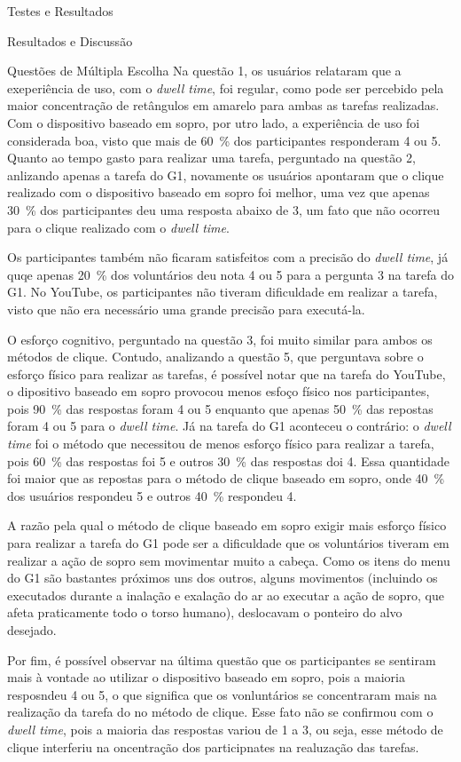 \begin{chapter}{Testes e Resultados}
\begin{section}{Resultados e Discussão}
\begin{subsection}{Questões de Múltipla Escolha}
Na questão 1, os usuários relataram que a exeperiência de uso, com o
\textit{dwell time}, foi regular, como pode ser percebido pela maior
concentração de retângulos em amarelo para ambas as tarefas realizadas. Com o
dispositivo baseado em sopro, por utro lado, a experiência de uso foi
considerada boa, visto que mais de 60~\% dos participantes responderam 4 ou 5.
Quanto ao tempo gasto para realizar uma tarefa, perguntado na questão 2,
anlizando apenas a tarefa do G1, novamente os usuários apontaram que o clique
realizado com o dispositivo baseado em sopro foi melhor, uma vez que apenas
30~\% dos participantes deu uma resposta abaixo de 3, um fato que não ocorreu
para o clique realizado com o \textit{dwell time}.

Os participantes também não ficaram satisfeitos com a precisão do \textit{dwell
time}, já quqe apenas 20~\% dos voluntários deu nota 4 ou 5 para a pergunta 3 na
tarefa do G1. No YouTube, os participantes não tiveram dificuldade em realizar a
tarefa, visto que não era necessário uma grande precisão para executá-la. 

O esforço cognitivo, perguntado na questão 3, foi muito similar para ambos os
métodos de clique. Contudo, analizando a questão 5, que perguntava sobre o
esforço físico para realizar as tarefas, é possível notar que na tarefa do
YouTube, o dipositivo baseado em sopro provocou menos esfoço físico nos
participantes, pois 90~\% das respostas foram 4 ou 5 enquanto que apenas 50~\%
das repostas foram 4 ou 5 para o \textit{dwell time}. Já na tarefa do G1
aconteceu o contrário: o \textit{dwell time} foi o método que necessitou de menos
esforço físico para realizar a tarefa, pois 60~\% das respostas foi 5 e outros
30~\% das respostas doi 4. Essa quantidade foi maior que as repostas para o
método de clique baseado em sopro, onde 40~\% dos usuários respondeu 5 e outros
40~\% respondeu 4.

A razão pela qual o método de clique baseado em sopro exigir mais esforço físico
para realizar a tarefa do G1 pode ser a dificuldade que os voluntários tiveram
em realizar a ação de sopro sem movimentar muito a cabeça. Como os itens do menu
do G1 são bastantes próximos uns dos outros, alguns movimentos (incluindo os
executados durante a inalação e exalação do ar ao executar a ação de sopro, 
que afeta praticamente todo o torso humano), deslocavam o ponteiro do alvo
desejado.

Por fim, é possível observar na última questão que os participantes se sentiram
mais à vontade ao utilizar o dispositivo baseado em sopro, pois a maioria
resposndeu 4 ou 5, o que significa que os vonluntários se concentraram mais na
realização da tarefa do no método de clique. Esse fato não se confirmou com o
\textit{dwell time}, pois a maioria das respostas variou de 1 a 3, ou seja, esse
método de clique interferiu na oncentração dos participnates na realuzação das
tarefas. 


\end{subsection}
\end{section}
\end{chapter}
